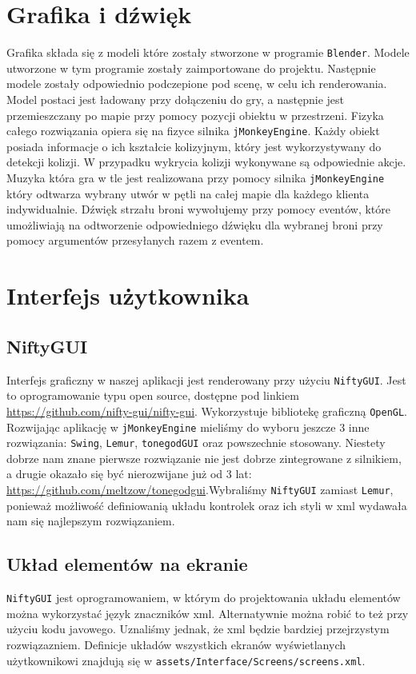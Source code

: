 \documentclass[]{report}
\newcommand{\code}[1]{\colorbox{codegray}{\texttt{#1}}}
\newcommand{\link}[1]{{\color{blue}\href{#1}{#1}}}
\begin{document}
\chapter*{Grafika i dźwięk}
Grafika składa się z modeli które zostały stworzone w programie \code{Blender}.
Modele utworzone w tym programie zostały zaimportowane do projektu.
Następnie modele zostały odpowiednio podczepione pod scenę, w celu ich renderowania.
Model postaci jest ładowany przy dołączeniu do gry, a następnie jest przemieszczany po mapie przy pomocy pozycji obiektu w przestrzeni.
Fizyka całego rozwiązania opiera się na fizyce silnika \code{jMonkeyEngine}.
Każdy obiekt posiada informacje o ich kształcie kolizyjnym, który jest wykorzystywany do detekcji kolizji.
W przypadku wykrycia kolizji wykonywane są odpowiednie akcje.
Muzyka która gra w tle jest realizowana przy pomocy silnika \code{jMonkeyEngine} który odtwarza wybrany utwór w pętli na całej mapie dla każdego klienta indywidualnie.
Dźwięk strzału broni wywołujemy przy pomocy eventów, które umożliwiają na odtworzenie odpowiedniego dźwięku dla wybranej broni przy pomocy argumentów przesyłanych razem z eventem.


\chapter*{Interfejs użytkownika}
\section{NiftyGUI}
Interfejs graficzny w naszej aplikacji jest renderowany przy użyciu \code{NiftyGUI}. Jest to oprogramowanie typu open source, dostępne pod linkiem \link{https://github.com/nifty-gui/nifty-gui}. Wykorzystuje bibliotekę graficzną \code{OpenGL}. Rozwijając aplikację w \code{jMonkeyEngine} mieliśmy do wyboru jeszcze 3 inne rozwiązania: \code{Swing}, \code{Lemur}, \code{tonegodGUI} oraz powszechnie stosowany. Niestety dobrze nam znane pierwsze rozwiązanie nie jest dobrze zintegrowane z silnikiem, a drugie okazało się być nierozwijane już od 3 lat: \link{https://github.com/meltzow/tonegodgui}.Wybraliśmy \code{NiftyGUI} zamiast \code{Lemur}, ponieważ możliwość definiowanią układu kontrolek oraz ich styli w xml wydawała nam się najlepszym rozwiązaniem.


\section{Układ elementów na ekranie}
\code{NiftyGUI} jest oprogramowaniem, w którym do projektowania układu elementów można wykorzystać język znaczników xml. Alternatywnie można robić to też przy użyciu kodu javowego. Uznaliśmy jednak, że xml będzie bardziej przejrzystym rozwiązazniem. Definicje układów wszystkich ekranów wyświetlanych użytkownikowi znajdują się w \code{assets/Interface/Screens/screens.xml}.
\end{document}
